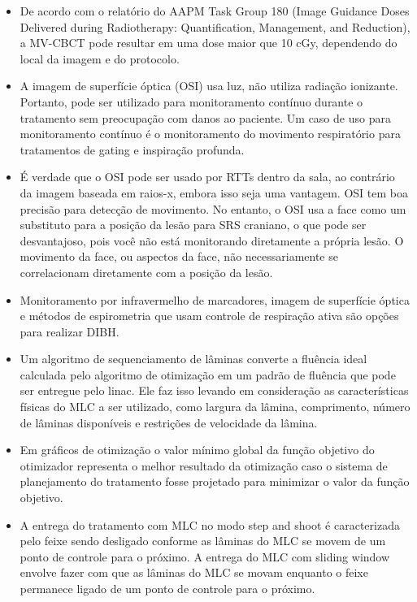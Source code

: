 \documentclass[11pt,a4paper]{article}
\newcounter{exemplo}
\begin{document}
\begin{exemplo}[Radioterapia]
\begin{itemize}
        \item De acordo com o relatório do AAPM Task Group 180 (Image Guidance Doses Delivered during Radiotherapy: Quantification, Management, and Reduction), a MV-CBCT pode resultar em uma dose maior que 10 cGy, dependendo do local da imagem e do protocolo.
        
        \item A imagem de superfície óptica (OSI) usa luz, não utiliza radiação ionizante. Portanto, pode ser utilizado para monitoramento contínuo durante o tratamento sem preocupação com danos ao paciente. Um caso de uso para monitoramento contínuo é o monitoramento do movimento respiratório para tratamentos de gating e inspiração profunda.
        
        \item É verdade que o OSI pode ser usado por RTTs dentro da sala, ao contrário da imagem baseada em raios-x, embora isso seja uma vantagem. OSI tem boa precisão para detecção de movimento. No entanto, o OSI usa a face como um substituto para a posição da lesão para SRS craniano, o que pode ser desvantajoso, pois você não está monitorando diretamente a própria lesão. O movimento da face, ou aspectos da face, não necessariamente se correlacionam diretamente com a posição da lesão.
        
        \item Monitoramento por infravermelho de marcadores, imagem de superfície óptica e métodos de espirometria que usam controle de respiração ativa são opções para realizar DIBH.
        
        \item Um algoritmo de sequenciamento de lâminas converte a fluência ideal calculada pelo algoritmo de otimização em um padrão de fluência que pode ser entregue pelo linac. Ele faz isso levando em consideração as características físicas do MLC a ser utilizado, como largura da lâmina, comprimento, número de lâminas disponíveis e restrições de velocidade da lâmina.
        \item Em gráficos de otimização o valor mínimo global da função objetivo do otimizador representa o melhor resultado da otimização caso o sistema de planejamento do tratamento fosse projetado para minimizar o valor da função objetivo.
        
        \item A entrega do tratamento com MLC no modo step and shoot é caracterizada pelo feixe sendo desligado conforme as lâminas do MLC se movem de um ponto de controle para o próximo. A entrega do MLC com sliding window envolve fazer com que as lâminas do MLC se movam enquanto o feixe permanece ligado de um ponto de controle para o próximo.
        

\end{itemize}
\end{exemplo}
\end{document}
